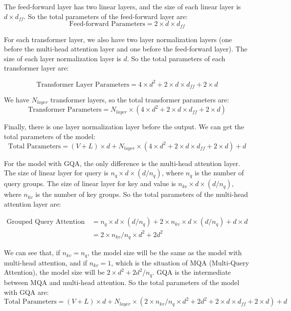 \documentclass[a4paper,12pt]{article}
\begin{document}
The feed-forward layer has two linear layers, and the size of each linear layer is $d \times d_{ff}$. So the total parameters of the feed-forward layer are:
\begin{equation}
    \text{Feed-forward Parameters} = 2 \times d \times d_{ff}
\end{equation}

For each transformer layer, we also have two layer normalization layers (one before the multi-head attention layer and one before the feed-forward layer). The size of each layer normalization layer is $d$. So the total parameters of each transformer layer are:

\begin{equation}
    \text{Transformer Layer Parameters} = 4 \times d^2 + 2 \times d \times d_{ff} + 2 \times d
\end{equation}

We have $N_{layer}$ transformer layers, so the total transformer parameters are:
\begin{equation}
    \text{Transformer Parameters} = N_{layer} \times (4 \times d^2 + 2 \times d \times d_{ff} + 2 \times d)
\end{equation}

Finally, there is one layer normalization layer before the output. We can get the total parameters of the model:
\begin{equation}
    \text{Total Parameters} = (V + L) \times d + N_{layer} \times (4 \times d^2 + 2 \times d \times d_{ff}+ 2 \times d) + d
\end{equation}

For the model with GQA, the only difference is the multi-head attention layer. The size of linear layer for query is $ n_q \times d \times (d / n_q)$, where $n_q$ is the number of query groups. The size of linear layer for key and value is $n_{kv} \times d \times (d / n_q)$, where $n_{kv}$ is the number of key groups. So the total parameters of the multi-head attention layer are:

\begin{align}
    \text{Grouped Query Attention Parameters} &= n_q \times d \times (d / n_q) + 2 \times n_{kv} \times d \times (d / n_q) + d \times d \\
    &= 2 \times n_{kv}/n_q \times d^2 + 2d^2
\end{align}

We can see that, if $n_{kv} = n_q$, the model size will be the same as the model with multi-head attention, and if $n_{kv} = 1$, which is the situation of MQA (Multi-Query Attention), the model size will be $2 \times d^2 + 2d^2/n_q$. GQA is the intermediate between MQA and multi-head attention. So the total parameters of the model with GQA are:
\begin{equation}
    \text{Total Parameters} = (V + L) \times d + N_{layer} \times (2 \times n_{kv}/n_q \times d^2 + 2d^2 + 2 \times d \times d_{ff}+ 2 \times d) + d
\end{equation}
\end{document}
